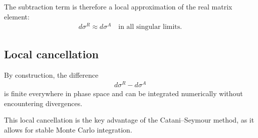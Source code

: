 The subtraction term is therefore a local approximation of the real matrix element:
\begin{align}
d\sigma^R \approx d\sigma^A \quad \text{in all singular limits}.
\end{align}

\subsection{Local cancellation}

By construction, the difference
\begin{align}
d\sigma^R - d\sigma^A
\end{align}
is finite everywhere in phase space and can be integrated numerically
without encountering divergences.

This local cancellation is the key advantage of the Catani--Seymour method,
as it allows for stable Monte Carlo integration.